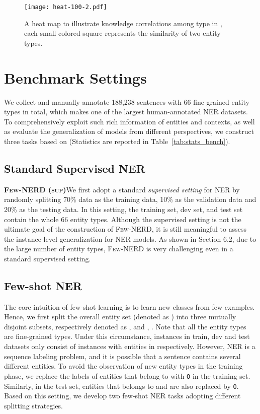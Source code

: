 \documentclass[11pt,a4paper, dvipsnames]{article}
\begin{document}
\begin{figure}
    \centering
    \texttt{[image: heat-100-2.pdf]}
    \caption{A heat map to illustrate knowledge correlations among type in , each small colored square represents the similarity of two entity types.}
    \label{fig:heat}
    \vspace{-0.3cm}
\end{figure}


\section{Benchmark Settings}
\label{sec:bench}



We collect and manually annotate 188,238 sentences with 66 fine-grained entity types in total, which makes  one of the largest human-annotated NER datasets. 
To comprehensively exploit such rich information of entities and contexts, as well as evaluate the generalization of models from different perspectives, we construct three tasks based on  (Statistics are reported in Table~\ref{tab:stats_bench}).

\subsection{Standard Supervised NER}
\label{sec:bench-supner}
\textbf{\textsc{Few-NERD (sup)}}\quad We first adopt a standard \textit{supervised setting} for NER by randomly splitting 70\% data as the training data, 10\% as the validation data and 20\% as the testing data.
 In this setting, the training set, dev set, and test set contain the whole 66 entity types. Although the supervised setting is not the ultimate goal of the construction of \textsc{Few-NERD}, it is still meaningful to assess the instance-level generalization for NER models. As shown in Section 6.2, due to the large number of entity types, \textsc{Few-NERD} is very challenging even in a standard supervised setting.
 

 
 
\subsection{Few-shot NER}
\label{sec:bench-fewner}
The core intuition of few-shot learning is to learn new classes from few examples. Hence, we first split the overall entity set (denoted as ) into three mutually disjoint subsets, respectively denoted as , and , . Note that all the entity types are fine-grained types.
Under this circumstance, instances in train, dev and test datasets only consist of instances with entities in  respectively. However, NER is a sequence labeling problem, and it is possible that a sentence contains several different entities. To avoid the observation of new entity types in the training phase, we replace the labels of entities that belong to  with \texttt{O} in the training set. Similarly, in the test set, entities that belongs to  and  are also replaced by \texttt{O}. Based on this setting, we develop two few-shot NER tasks adopting different splitting strategies.
\end{document}
